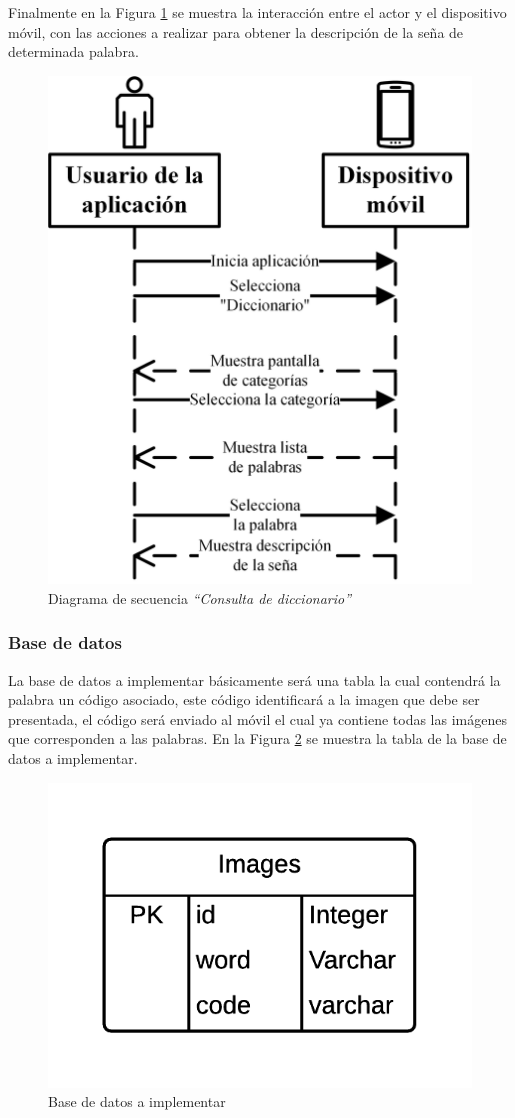Finalmente en la Figura \ref{fig:secDiccionario} se muestra la interacción entre el actor y el dispositivo móvil, con las acciones a realizar para obtener la descripción de la seña de determinada palabra.

		\begin{figure}[H]
			\centering
			\includegraphics[width=0.5\linewidth]{figures/secuenciaDiccionario}
			\caption{Diagrama de secuencia \textit{``Consulta de diccionario''}}
			\label{fig:secDiccionario}
		\end{figure}		
		
\subsubsection{Base de datos}

La base de datos a implementar básicamente será una tabla la cual contendrá la palabra un código asociado, este código identificará a la imagen que debe ser presentada, el código será enviado al móvil el cual ya contiene todas las imágenes que corresponden a las palabras. En la Figura \ref{fig:database} se muestra la tabla de la base de datos a implementar.

		\begin{figure}[H]
			\centering
			\includegraphics[width=0.5\linewidth]{figures/database}
			\caption{Base de datos a implementar}
			\label{fig:database}
		\end{figure}		

